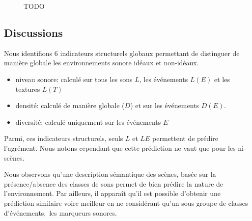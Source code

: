 \begin{figure}[t]
       \caption[TODO]{TODO}\label{fig:soundlevelMarker}
\end{figure}




\subsection{Discussions}

Nous identifions 6 indicateurs structurels globaux permettant de distinguer de manière globale les environnements sonore idéaux et non-idéaux.

\begin{itemize}
\item niveau sonore: calculé sur tous les sons $L$, les événements $L(E)$ et les textures $L(T)$ 
\item densité: calculé de manière globale ($D$) et sur les événements $D(E)$.
\item diversité: calculé uniquement sur les événements $E$
\end{itemize}

Parmi, ces indicateurs structurels, seuls $L$ et $LE$ permettent de prédire l'agrément. Nous notons cependant que cette prédiction ne vaut que pour les ni-scènes. 

Nous observons qu'une description sémantique des scènes, basée sur la présence/absence des classes de sons permet de bien prédire la nature de l'environnement. Par ailleurs, il apparaît qu'il est possible d'obtenir une prédiction similaire voire meilleur en ne considérant qu'un sous groupe de classes d'événements,\ie~les marqueurs sonores.

